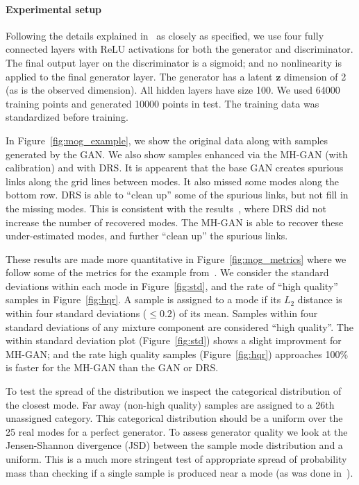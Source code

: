 \documentclass{article}
\renewcommand{\vec}[1]{{\boldsymbol{\mathbf{#1}}}} %
\begin{document}
\paragraph{Experimental setup}
Following the details explained in~\citet{Azadi2018} as closely as specified, we use four fully connected layers with ReLU activations for both the generator and discriminator.
The final output layer on the discriminator is a sigmoid; and no nonlinearity is applied to the final generator layer.
The generator has a latent $\vec z$ dimension of 2 (as is the observed dimension)\@.
All hidden layers have size 100.
We used \num{64000} training points and generated \num{10000} points in test.
The training data was standardized before training.



In Figure~\ref{fig:mog_example}, we show the original data along with samples generated by the GAN\@.
We also show samples enhanced via the MH-GAN (with calibration) and with DRS\@.
It is appearent that the base GAN creates spurious links along the grid lines between modes.
It also missed some modes along the bottom row.
DRS is able to ``clean up'' some of the spurious links, but not fill in the missing modes.
This is consistent with the results~\citet{Azadi2018}, where DRS did not increase the number of recovered modes.
The MH-GAN is able to recover these under-estimated modes, and further ``clean up'' the spurious links.

These results are made more quantitative in Figure~\ref{fig:mog_metrics} where we follow some of the metrics for the example from~\citet{Azadi2018}.
We consider the standard deviations within each mode in Figure~\ref{fig:std}, and the rate of ``high quality'' samples in Figure~\ref{fig:hqr}.
A sample is assigned to a mode if its $L_2$ distance is within four standard deviations ($\leq 0.2$) of its mean.
Samples within four standard deviations of any mixture component are considered ``high quality''.
The within standard deviation plot (Figure~\ref{fig:std}) shows a slight improvment for MH-GAN; and the rate high quality samples (Figure~\ref{fig:hqr}) approaches 100\% is faster for the MH-GAN than the GAN or DRS\@.

To test the spread of the distribution we inspect the categorical distribution of the closest mode.
Far away (non-high quality) samples are assigned to a 26th unassigned category.
This categorical distribution should be a uniform over the 25 real modes for a perfect generator.
To assess generator quality we look at the Jensen-Shannon divergence (JSD) between the sample mode distribution and a uniform.
This is a much more stringent test of appropriate spread of probability mass than checking if a single sample is produced near a mode (as was done in~\citet{Azadi2018})\@.
\end{document}
